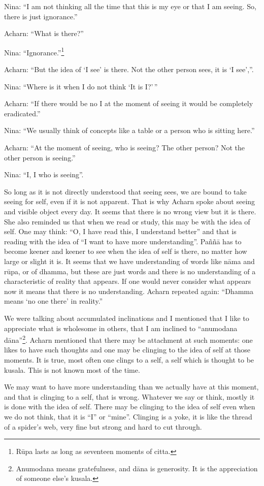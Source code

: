 Nina: ``I am not thinking all the time that this is my eye or that I am
seeing. So, there is just ignorance.''

Acharn: ``What is there?''

Nina: ``Ignorance.''\footnote{Rūpa lasts as long as
seventeen moments of citta.}

Acharn: ``But the idea of `I see' is there. Not the other person sees,
it is `I see',''.

Nina: ``Where is it when I do not think `It is I?'\,''

Acharn: ``If there would be no I at the moment of seeing it would be
completely eradicated.''

Nina: ``We usually think of concepts like a table or a person who is
sitting here.''

Acharn: ``At the moment of seeing, who is seeing? The other person? Not
the other person is seeing.''

Nina: ``I, I who is seeing''.

So long as it is not directly understood that seeing sees, we are bound
to take seeing for self, even if it is not apparent. That is why Acharn
spoke about seeing and visible object every day. It seems that there is
no wrong view but it is there. She also reminded us that when we read or
study, this may be with the idea of self. One may think: ``O, I have
read this, I understand better'' and that is reading with the idea of
``I want to have more understanding''. Paññā has to become keener and
keener to see when the idea of self is there, no matter how large or
slight it is. It seems that we have understanding of words like nāma and
rūpa, or of dhamma, but these are just words and there is no
understanding of a characteristic of reality that appears. If one would
never consider what appears now it means that there is no understanding.
Acharn repeated again: ``Dhamma means `no one there' in reality.''

We were talking about accumulated inclinations and I mentioned that I
like to appreciate what is wholesome in others, that I am inclined to
``anumodana dāna''\footnote{Anumodana means
gratefulness, and dāna is generosity. It is the appreciation of someone
else's kusala.
}.
Acharn mentioned that there may be attachment at such moments: one likes
to have such thoughts and one may be clinging to the idea of self at
those moments. It is true, most often one clings to a self, a self which
is thought to be kusala. This is not known most of the time.

We may want to have more understanding than we actually have at this
moment, and that is clinging to a self, that is wrong. Whatever we say
or think, mostly it is done with the idea of self. There may be clinging
to the idea of self even when we do not think, that it is ``I'' or
``mine''. Clinging is a yoke, it is like the thread of a spider's web,
very fine but strong and hard to cut through. 

